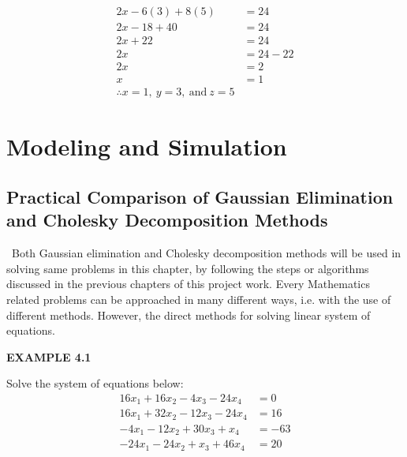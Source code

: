 \documentclass[a4paper, 12pt]{report}
\begin{document}
{\begin{align*}
2x-6(3)+8(5)&=24\\
2x-18+40&=24\\
2x+22&=24\\
2x&=24-22\\
2x&=2\\
x&=1\\
\therefore x=1,\ y=3,\ \text{and}\ z=5
\end{align*}

        
      \chapter{Modeling and Simulation }  
      \section{Practical Comparison of Gaussian Elimination and Cholesky Decomposition Methods}\
 Both Gaussian elimination and Cholesky decomposition methods will be  used in solving same problems in this chapter, by following the steps or algorithms discussed in the previous chapters of this project work. Every Mathematics related problems can be approached in many different ways, i.e. with the use of different methods. However, the direct methods for solving linear system of equations.\\
      
      \begin{center}
      	\textbf{EXAMPLE 4.1}
      \end{center}
      Solve the system of equations below:
      \begin{align*}
      16x_1 + 16x_2 - 4x_3 - 24x_4 &= 0\\
      16x_1 + 32x_2 - 12x_3 - 24x_4 &= 16\\
      -4x_1 - 12x_2 + 30x_3 + x_4 &= -63\\
      -24x_1 - 24x_2 + x_3 + 46x_4 &= 20\\
      \end{align*}
      
}
\end{document}
